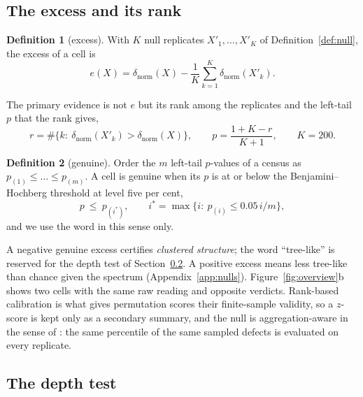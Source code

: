 \documentclass{article}
\theoremstyle{definition}
\newtheorem{definition}{Definition}
\begin{document}
\subsection{The excess and its rank}
\label{sec:v2-excess}

\begin{shaded}
\begin{definition}[excess]
\label{def:excess}
With $K$ null replicates $X'_1,\dots,X'_K$ of Definition~\ref{def:null}, the excess of a cell is
\begin{equation}
e(X)=\delta_{\text{norm}}(X)-\frac{1}{K}\sum_{k=1}^{K}\delta_{\text{norm}}(X'_k).
\label{eq:excess}
\end{equation}
\end{definition}
\end{shaded}
The primary evidence is not $e$ but its rank among the replicates and the left-tail $p$ that the rank gives,
\begin{equation}
r=\#\{k:\ \delta_{\text{norm}}(X'_k)>\delta_{\text{norm}}(X)\},\qquad p=\frac{1+K-r}{K+1},\qquad K=200.
\label{eq:rank}
\end{equation}
\begin{shaded}
\begin{definition}[genuine]
\label{def:genuine}
Order the $m$ left-tail $p$-values of a census as $p_{(1)}\le\dots\le p_{(m)}$. A cell is genuine when its $p$ is at or below the Benjamini--Hochberg threshold at level five per cent,
\begin{equation}
p\ \le\ p_{(i^{*})},\qquad i^{*}=\max\{i:\ p_{(i)}\le 0.05\, i/m\},
\label{eq:bh}
\end{equation}
and we use the word in this sense only.
\end{definition}
\end{shaded}
A negative genuine excess certifies \emph{clustered structure}; the word ``tree-like'' is reserved for the depth test of Section~\ref{sec:v2-depth}. A positive excess means less tree-like than chance given the spectrum (Appendix~\ref{app:nulls}). Figure~\ref{fig:overview}b shows two cells with the same raw reading and opposite verdicts. Rank-based calibration is what gives permutation scores their finite-sample validity, so a $z$-score is kept only as a secondary summary, and the null is aggregation-aware in the sense of \citet[\S5]{groger2026aristotelian}: the same percentile of the same sampled defects is evaluated on every replicate.

\subsection{The depth test}
\label{sec:v2-depth}
\end{document}
